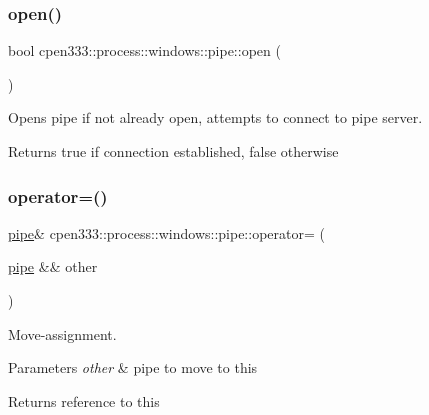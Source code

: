 \subsubsection{\texorpdfstring{open()}{open()}}
{\footnotesize\ttfamily bool cpen333\+::process\+::windows\+::pipe\+::open (\begin{DoxyParamCaption}{ }\end{DoxyParamCaption})\hspace{0.3cm}{\ttfamily [inline]}}



Opens pipe if not already open, attempts to connect to pipe server. 

\begin{DoxyReturn}{Returns}
true if connection established, false otherwise 
\end{DoxyReturn}
\mbox{\label{classcpen333_1_1process_1_1windows_1_1pipe_a8e99292210a457c3c03f268fabd74e77}} 
\subsubsection{\texorpdfstring{operator=()}{operator=()}}
{\footnotesize\ttfamily \hyperlink{classcpen333_1_1process_1_1windows_1_1pipe}{pipe}\& cpen333\+::process\+::windows\+::pipe\+::operator= (\begin{DoxyParamCaption}\item[{\hyperlink{classcpen333_1_1process_1_1windows_1_1pipe}{pipe} \&\&}]{other }\end{DoxyParamCaption})\hspace{0.3cm}{\ttfamily [inline]}}



Move-\/assignment. 


\begin{DoxyParams}{Parameters}
{\em other} & pipe to move to this \\
\hline
\end{DoxyParams}
\begin{DoxyReturn}{Returns}
reference to this 
\end{DoxyReturn}
\mbox{\label{classcpen333_1_1process_1_1windows_1_1pipe_a35e7d782aae4879ae3625f61b2d78783}} 
